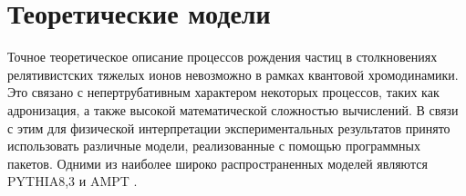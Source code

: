 \begin{comment}
	\section{Рождение частиц в столкновениях релятивистских ионов}
	\section{Отношения частиц и химическое равновесие}
	Различия между механизмами рождения различных адронов могут быть установлены с помощью отношения их инвариантных спектров по поперечному импульсу. Установлено [], что отношения рожденных адронов хорошо описываются простой статистической моделью [].
	\begin{figure}[ht] 
		\centerfloat
		\includegraphics [width = 0,9\linewidth] {Intro/RatiosExp.png}
		\caption{Отношения выходов адронов. Сравнение между статистической моделью (горизонтальные линии) и экспериментальными отношениями (круги)} 
		\label{img:RatiosExp}  
	\end{figure}
	
	Статистическая модель основана на использовании большого канонического ансамбля для описания статистической суммы и, следовательно, плотности частиц вида $i$ в равновесном состоянии кварк-глонной материи:
	\begin{equation}
		\label{eq:Ratio}
		n_i = \frac{g_i}{2 \pi ^2}\int_0^{\infty} \frac{p^2 dp}{exp[(E_i - \mu_i)/T_{ch}]\pm 1}
	\end{equation}
	где  $n_i$ - плотность частиц, $g_i$ - спиновое вырождение, $p$ - импульс, $E$ - полная энергия и $\mu_i =\mu_B B_i - \mu_S S_i - \mu_{I_3} I_{3i}$ - химический потенциал. Величины $B_i$, $S_i$ и $I_{3i}$ представляют собой барионное число, странность и третью компоненту изоспина для частицы вида $i$. В данной модели присутствуют только два параметра: температура $T_{ch}$ и барионный химический потенциал $\mu_B$, которые являются независимыми.  На рис. ??? показано сравнение измеренных интегральных отношений выходов частиц частиц и расчетов согласно статистической модели. Как видно из рисунка, данная модель хорошо согласовывается с экспериментальными данными.
	Совпадаение экспериментальных данных с расчетсами статистической модели указывает на сохранение химического равновесия в системе. 
\end{comment}

\section{Теоретические модели}
Точное теоретическое описание процессов рождения частиц в столкновениях релятивистских тяжелых ионов невозможно в рамках квантовой хромодинамики. Это связано с непертрубативным характером некоторых процессов, таких как адронизация, а также высокой математической сложностью вычислений. В связи с этим для физической интерпретации экспериментальных результатов принято использовать различные модели, реализованные с помощью программных пакетов. Одними из наиболее широко распространенных моделей являются PYTHIA8,3 \cite{pythia} и AMPT \cite{AMPT}.

